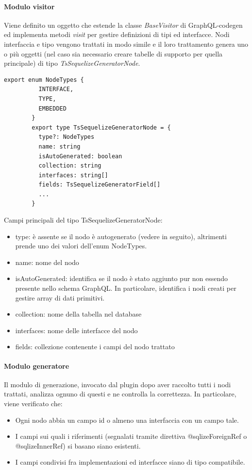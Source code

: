 \documentclass[a4paper, 12pt]{report}
\begin{document}
      \paragraph*{Modulo visitor}
      Viene definito un oggetto che estende la classe \emph{BaseVisitor} di GraphQL-codegen ed implementa metodi \emph{visit} per gestire definizioni di tipi ed interfacce.
      Nodi interfaccia e tipo vengono trattati in modo simile e il loro trattamento genera uno o più oggetti (nel caso sia necessario creare tabelle di supporto per quella principale) di tipo \emph{TsSequelizeGeneratorNode}.
      \begin{Verbatim}[samepage=true]
        export enum NodeTypes {
          INTERFACE,
          TYPE,
          EMBEDDED
        }
        export type TsSequelizeGeneratorNode = {
          type?: NodeTypes
          name: string
          isAutoGenerated: boolean
          collection: string
          interfaces: string[]
          fields: TsSequelizeGeneratorField[]
          ...
        }       
      \end{Verbatim}
      Campi principali del tipo TsSequelizeGeneratorNode:
      \begin{itemize}
        \item type: è assente se il nodo è autogenerato (vedere in seguito), altrimenti prende uno dei valori dell'enum NodeTypes.
        \item name: nome del nodo
        \item isAutoGenerated: identifica se il nodo è stato aggiunto pur non essendo presente nello schema GraphQL. In particolare, identifica i nodi creati per gestire array di dati primitivi.
        \item collection: nome della tabella nel database
        \item interfaces: nome delle interfacce del nodo
        \item fields: collezione contenente i campi del nodo trattato
      \end{itemize}
      \paragraph*{Modulo generatore}
      Il modulo di generazione, invocato dal plugin dopo aver raccolto tutti i nodi trattati, analizza ognuno di questi e ne controlla la correttezza.
      In particolare, viene verificato che:
      \begin{itemize}
        \item Ogni nodo abbia un campo id o almeno una interfaccia con un campo tale.
        \item I campi sui quali i riferimenti (segnalati tramite direttiva @sqlizeForeignRef o @sqlizeInnerRef) si basano siano esistenti.
        \item I campi condivisi fra implementazioni ed interfacce siano di tipo compatibile.
      \end{itemize}
\end{document}
